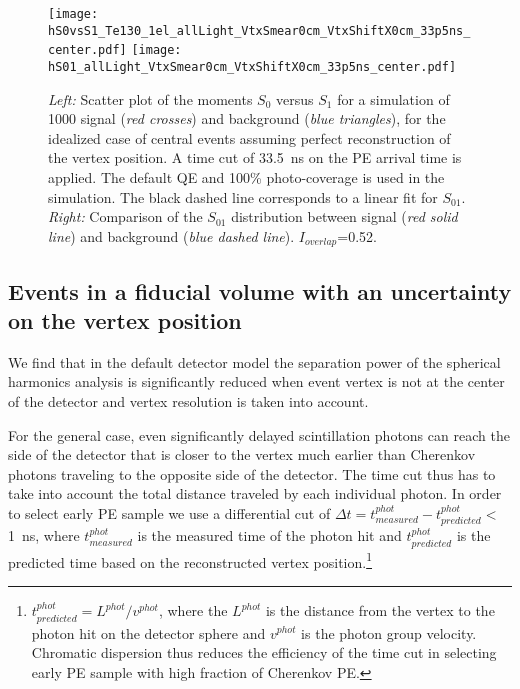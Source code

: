

\begin{figure*}[h]
  \centering
  \texttt{[image: hS0vsS1\_Te130\_1el\_allLight\_VtxSmear0cm\_VtxShiftX0cm\_33p5ns\_center.pdf]}
  \texttt{[image: hS01\_allLight\_VtxSmear0cm\_VtxShiftX0cm\_33p5ns\_center.pdf]}
  \caption{\emph{Left:} Scatter plot of the moments $S_0$ versus $S_1$
    for a simulation of 1000 signal (\emph{red crosses}) and
    background (\emph{blue triangles}), for the idealized case of
    central events assuming perfect reconstruction of the vertex
    position. A time cut of 33.5~ns on the PE arrival time is
    applied. The default QE and 100\% photo-coverage is used in the
    simulation.  The black dashed line corresponds to a linear fit for
    $S_{01}$.  \emph{Right:} Comparison of the $S_{01}$ distribution
    between signal (\emph{red solid line}) and background (\emph{blue
    dashed line}).  $I_{overlap}$=0.52.}
\label{fig:SL_Te_33p5ns_center}
\end{figure*}


\subsection{Events in a fiducial volume with an uncertainty on the vertex position}

We find that in the default detector model the separation power of
the spherical harmonics analysis is significantly reduced when event
vertex is not at the center of the detector and vertex resolution
is taken into account.


For the general case, even
significantly delayed scintillation photons can reach the side of the
detector that is closer to the vertex much earlier than Cherenkov
photons traveling to the opposite side of the detector. The time cut
thus has to take into account the total distance traveled by each
individual photon. In order to select early PE sample we use a 
differential cut of 
$\Delta t=t^{phot}_{measured} - t^{phot}_{predicted}<$1~ns, where 
$t^{phot}_{measured}$ is the measured time of the photon hit and
$t^{phot}_{predicted}$ is the predicted time based on the reconstructed 
vertex position.\footnote{ $t^{phot}_{predicted} = L^{phot}/v^{phot}$, 
where the $L^{phot}$ is the distance from the vertex to the photon hit 
on the detector sphere and $v^{phot}$ is the photon group velocity. 
Chromatic dispersion thus reduces the efficiency of the time cut in 
selecting early PE sample with high fraction of Cherenkov PE.}


